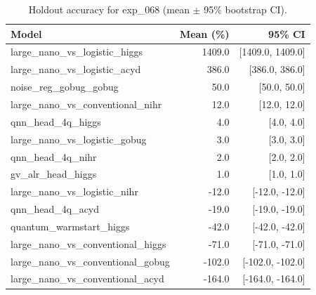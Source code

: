 \begin{table}[ht]
\centering
\caption{Holdout accuracy for exp_068 (mean $\pm$ 95\% bootstrap CI).}
\label{tab:exp_068}
\begin{tabular}{lrr}
\toprule
Model & Mean (\%) & 95\% CI \\
\midrule
large\_nano\_vs\_logistic\_higgs & 1409.0 & [1409.0, 1409.0] \\
large\_nano\_vs\_logistic\_acyd & 386.0 & [386.0, 386.0] \\
noise\_reg\_gobug\_gobug & 50.0 & [50.0, 50.0] \\
large\_nano\_vs\_conventional\_nihr & 12.0 & [12.0, 12.0] \\
qnn\_head\_4q\_higgs & 4.0 & [4.0, 4.0] \\
large\_nano\_vs\_logistic\_gobug & 3.0 & [3.0, 3.0] \\
qnn\_head\_4q\_nihr & 2.0 & [2.0, 2.0] \\
gv\_alr\_head\_higgs & 1.0 & [1.0, 1.0] \\
large\_nano\_vs\_logistic\_nihr & -12.0 & [-12.0, -12.0] \\
qnn\_head\_4q\_acyd & -19.0 & [-19.0, -19.0] \\
quantum\_warmstart\_higgs & -42.0 & [-42.0, -42.0] \\
large\_nano\_vs\_conventional\_higgs & -71.0 & [-71.0, -71.0] \\
large\_nano\_vs\_conventional\_gobug & -102.0 & [-102.0, -102.0] \\
large\_nano\_vs\_conventional\_acyd & -164.0 & [-164.0, -164.0] \\
\bottomrule
\end{tabular}
\end{table}
